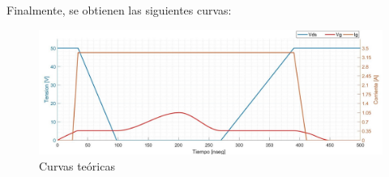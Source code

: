 \documentclass[e4_tp1_main.tex]{subfiles}
\begin{document}
Finalmente, se obtienen las siguientes curvas:\\
\begin{figure}[H]
  \includegraphics[width=\linewidth]{images/ej1/CurvasTeoricas.jpg}
  \caption{Curvas teóricas}
  \label{fig:Curva-Teorica}
\end{figure}
\end{document}
